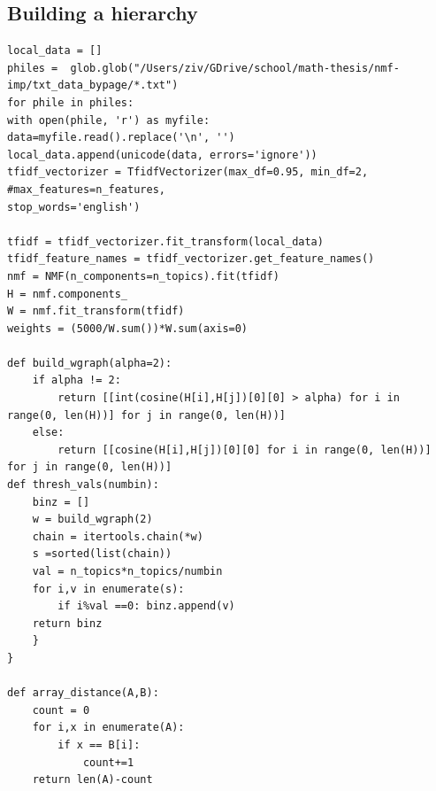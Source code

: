 \documentclass[12pt]{pom_thesis}
\begin{document}
\subsection*{Building a hierarchy}
\begin{lstlisting}
local_data = []
philes =  glob.glob("/Users/ziv/GDrive/school/math-thesis/nmf-imp/txt_data_bypage/*.txt")
for phile in philes:
with open(phile, 'r') as myfile:
data=myfile.read().replace('\n', '')
local_data.append(unicode(data, errors='ignore'))
tfidf_vectorizer = TfidfVectorizer(max_df=0.95, min_df=2, #max_features=n_features,
stop_words='english')

tfidf = tfidf_vectorizer.fit_transform(local_data)
tfidf_feature_names = tfidf_vectorizer.get_feature_names()
nmf = NMF(n_components=n_topics).fit(tfidf)
H = nmf.components_
W = nmf.fit_transform(tfidf)
weights = (5000/W.sum())*W.sum(axis=0)

def build_wgraph(alpha=2):
	if alpha != 2:
		return [[int(cosine(H[i],H[j])[0][0] > alpha) for i in range(0, len(H))] for j in range(0, len(H))]
	else:
		return [[cosine(H[i],H[j])[0][0] for i in range(0, len(H))] for j in range(0, len(H))]
def thresh_vals(numbin):
	binz = []
	w = build_wgraph(2)
	chain = itertools.chain(*w)
	s =sorted(list(chain))
	val = n_topics*n_topics/numbin
	for i,v in enumerate(s):
		if i%val ==0: binz.append(v)
	return binz
	}    
}

def array_distance(A,B):
	count = 0
	for i,x in enumerate(A):
		if x == B[i]:
			count+=1
	return len(A)-count


\end{lstlisting}
\end{document}

